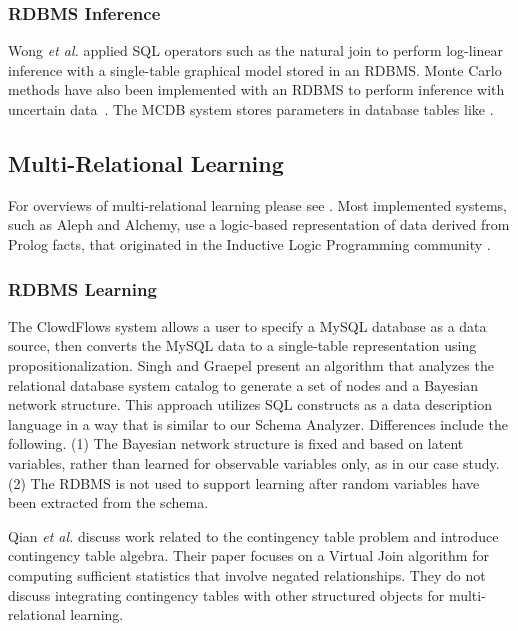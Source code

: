 \documentclass{IEEEtran}
\begin{document}
\subsubsection{RDBMS Inference}
Wong {\em et al.}  applied SQL operators such as the natural join to perform log-linear inference with a single-table graphical model \cite{Wong1995} stored in an RDBMS. 
Monte Carlo methods have also been implemented with an RDBMS  to perform inference with uncertain data~\cite{MCDB_SIGMOD_2008,Wick_VLDB_2010}.
The MCDB system \cite{MCDB_SIGMOD_2008}  stores parameters in database tables like \FB. 



\subsection{Multi-Relational Learning} 
For overviews of multi-relational learning please see \cite{SRL2007,Domingos2009,Kimmig2015}. 
Most implemented systems, such as Aleph and Alchemy, use a logic-based representation of data derived from Prolog facts, that originated in the Inductive Logic Programming community \cite{Dzeroski2001c}. 

\subsubsection{RDBMS Learning}
The ClowdFlows system \cite{Lavravc2014} allows a user to specify a MySQL database as a data source, then converts the MySQL data to a single-table representation using propositionalization. 
Singh and Graepel \cite{Singh2013} present an algorithm that analyzes the relational database system catalog to generate a set of nodes and a Bayesian network structure. 
This approach utilizes SQL constructs as a data description language in a way that is similar to our Schema Analyzer. 
Differences include the following. (1) The Bayesian network structure is fixed and based on latent variables, rather than learned for observable variables only, as in our case study. (2) The RDBMS is not used to support learning after random variables have been extracted from the schema. 


Qian {\em et al.} \cite{Qian2014a}  discuss work related to the contingency table problem and introduce contingency table algebra. Their paper focuses on a Virtual Join algorithm for computing sufficient statistics that involve negated relationships. They do not discuss integrating contingency tables with other structured objects for multi-relational learning. 
\end{document}
